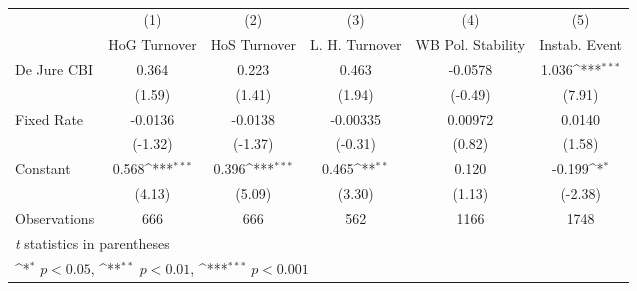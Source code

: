 \begin{table}[htbp]\centering
\def\sym#1{\ifmmode^{#1}\else\(^{#1}\)\fi}
\caption{\label{hkmultIndFEDJ}}
\begin{tabular}{l*{5}{c}}
\toprule
                                        &\multicolumn{1}{c}{(1)}&\multicolumn{1}{c}{(2)}&\multicolumn{1}{c}{(3)}&\multicolumn{1}{c}{(4)}&\multicolumn{1}{c}{(5)}\\
                                        &\multicolumn{1}{c}{HoG Turnover}&\multicolumn{1}{c}{HoS Turnover}&\multicolumn{1}{c}{L. H. Turnover}&\multicolumn{1}{c}{WB Pol. Stability}&\multicolumn{1}{c}{Instab. Event}\\
\midrule
De Jure CBI                             &    0.364         &    0.223         &    0.463         &  -0.0578         &    1.036\sym{***}\\
                                        &   (1.59)         &   (1.41)         &   (1.94)         &  (-0.49)         &   (7.91)         \\
\addlinespace
Fixed Rate                              &  -0.0136         &  -0.0138         & -0.00335         &  0.00972         &   0.0140         \\
                                        &  (-1.32)         &  (-1.37)         &  (-0.31)         &   (0.82)         &   (1.58)         \\
\addlinespace
Constant                                &    0.568\sym{***}&    0.396\sym{***}&    0.465\sym{**} &    0.120         &   -0.199\sym{*}  \\
                                        &   (4.13)         &   (5.09)         &   (3.30)         &   (1.13)         &  (-2.38)         \\
\midrule
Observations                            &      666         &      666         &      562         &     1166         &     1748         \\
\bottomrule
\multicolumn{6}{l}{\footnotesize \textit{t} statistics in parentheses}\\
\multicolumn{6}{l}{\footnotesize \sym{*} \(p<0.05\), \sym{**} \(p<0.01\), \sym{***} \(p<0.001\)}\\
\end{tabular}
\end{table}
